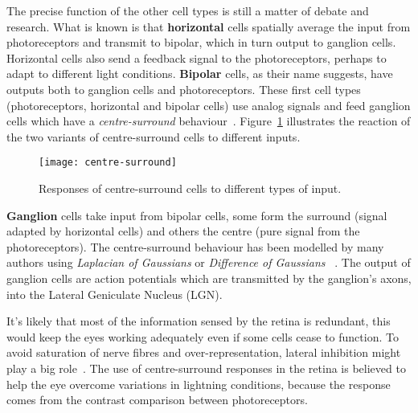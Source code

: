 The precise function of the other cell types is still a matter of debate and research. What is known is that \textbf{horizontal} cells  spatially average the input from photoreceptors and transmit to bipolar, which in turn output to ganglion cells. Horizontal cells also send a feedback signal to the photoreceptors, perhaps to adapt to different light conditions. \textbf{Bipolar} cells, as their name suggests, have outputs both to ganglion cells and photoreceptors. These first cell types (photoreceptors, horizontal and bipolar cells) use analog signals and feed ganglion cells which have a \emph{centre-surround} behaviour~\cite{eye-brain-vision-hubel1995,thompson2000brain}. Figure~\ref{fig:vision:centre-surround} illustrates the reaction of the two variants of centre-surround cells to different inputs.

\begin{figure}[h]
  \begin{center}
    \texttt{[image: centre-surround]}
    \caption{Responses of centre-surround cells to different types of input.}
    \label{fig:vision:centre-surround}
  \end{center}
\end{figure}


\textbf{Ganglion} cells take input from bipolar cells, some form the surround (signal adapted by horizontal cells) and others the centre (pure signal from the photoreceptors). The centre-surround behaviour has been modelled by many authors using \emph{Laplacian of Gaussians} or \emph{Difference of Gaussians} ~\cite{thorpe-rate-coding-theory,virtual-retina,webvision-midget}. The output of ganglion cells are action potentials which are transmitted by the ganglion's axons, into the Lateral Geniculate Nucleus (LGN).

It's likely that most of the information sensed by the retina is redundant, this would keep the eyes working adequately even if some cells cease to function. To avoid saturation of nerve fibres and over-representation, lateral inhibition might play a big role~\cite{basab-model,thorpe-rate-coding-theory,field-sensory-coding}. The use of centre-surround responses in the retina is believed to help the eye overcome variations in lightning conditions, because the response comes from the contrast comparison between photoreceptors.

